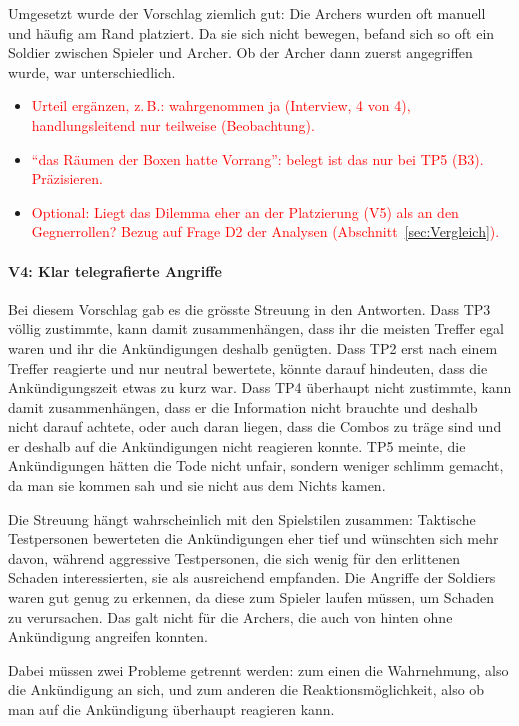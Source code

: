 \documentclass[../Main.tex]{subfiles}
\begin{document}
Umgesetzt wurde der Vorschlag ziemlich gut: Die Archers wurden oft manuell und häufig am Rand platziert. Da sie sich nicht bewegen, befand sich so oft ein Soldier zwischen Spieler und Archer. Ob der Archer dann zuerst angegriffen wurde, war unterschiedlich.

\begin{itemize}[leftmargin=1.5cm]
    \item \textcolor{red}{Urteil ergänzen, z.\,B.: wahrgenommen ja (Interview, 4 von 4), handlungsleitend nur teilweise (Beobachtung).}
    \item \textcolor{red}{\enquote{das Räumen der Boxen hatte Vorrang}: belegt ist das nur bei TP5 (B3). Präzisieren.}
    \item \textcolor{red}{Optional: Liegt das Dilemma eher an der Platzierung (V5) als an den Gegnerrollen? Bezug auf Frage D2 der Analysen (Abschnitt~\ref{sec:Vergleich}).}
\end{itemize}

\paragraph{V4: Klar telegrafierte Angriffe}
Bei diesem Vorschlag gab es die grösste Streuung in den Antworten. Dass TP3 völlig zustimmte, kann damit zusammenhängen, dass ihr die meisten Treffer egal waren und ihr die Ankündigungen deshalb genügten. Dass TP2 erst nach einem Treffer reagierte und nur neutral bewertete, könnte darauf hindeuten, dass die Ankündigungszeit etwas zu kurz war. Dass TP4 überhaupt nicht zustimmte, kann damit zusammenhängen, dass er die Information nicht brauchte und deshalb nicht darauf achtete, oder auch daran liegen, dass die Combos zu träge sind und er deshalb auf die Ankündigungen nicht reagieren konnte. TP5 meinte, die Ankündigungen hätten die Tode nicht unfair, sondern weniger schlimm gemacht, da man sie kommen sah und sie nicht aus dem Nichts kamen.

Die Streuung hängt wahrscheinlich mit den Spielstilen zusammen: Taktische Testpersonen bewerteten die Ankündigungen eher tief und wünschten sich mehr davon, während aggressive Testpersonen, die sich wenig für den erlittenen Schaden interessierten, sie als ausreichend empfanden. Die Angriffe der Soldiers waren gut genug zu erkennen, da diese zum Spieler laufen müssen, um Schaden zu verursachen. Das galt nicht für die Archers, die auch von hinten ohne Ankündigung angreifen konnten.

Dabei müssen zwei Probleme getrennt werden: zum einen die Wahrnehmung, also die Ankündigung an sich, und zum anderen die Reaktionsmöglichkeit, also ob man auf die Ankündigung überhaupt reagieren kann.
\end{document}
